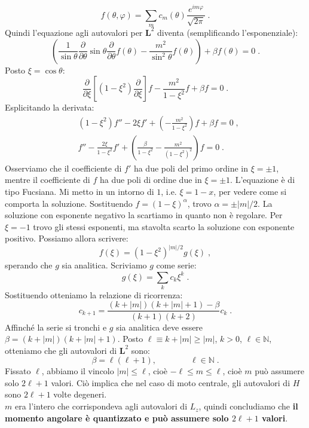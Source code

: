 \documentclass[10pt,a4paper]{report}
\theoremstyle{definition}
\numberwithin{equation}{section}
\begin{document}
\begin{equation}
f(\theta,\varphi)=\sum_m c_m(\theta)\frac{e^{im\varphi}}{\sqrt{2\pi}}\;.
\end{equation}
Quindi l'equazione agli autovalori per $\mathbf{L}^2$ diventa (semplificando l'esponenziale):
\begin{equation}
\left(\frac{1}{\sin\theta}\frac{\partial}{\partial\theta}\sin\theta\frac{\partial}{\partial\theta}f(\theta)-\frac{m^2}{\sin^2\theta}f(\theta)\right)+\beta f(\theta)=0\;.
\end{equation}
Posto $\xi=\cos\theta$:
\begin{equation}
\frac{\partial}{\partial\xi}\left[(1-\xi^2)\frac{\partial}{\partial\xi}\right]f-\frac{m^2}{1-\xi^2}f+\beta f=0\;.
\end{equation}
Esplicitando la derivata:
\begin{align*}
&(1-\xi^2)f''-2\xi f'+\left(-\frac{m^2}{1-\xi^2}\right)f+\beta f=0\;, \\
&f''-\frac{2\xi}{1-\xi^2}f'+\left(\frac{\beta}{1-\xi^2}-\frac{m^2}{(1-\xi^2)^2}\right)f=0\;.
\end{align*}
Osserviamo che il coefficiente di $f'$ ha due poli del primo ordine in $\xi=\pm 1$, mentre il coefficiente di $f$ ha due poli di ordine due in $\xi=\pm 1$. L'equazione è di tipo Fucsiana. Mi metto in un intorno di $1$, i.e. $\xi=1-x$, per vedere come si comporta la soluzione. Sostituendo $f=(1-\xi)^{\alpha}$, trovo $\alpha=\pm |m|/2$. La soluzione con esponente  negativo la scartiamo in quanto non è regolare. Per $\xi=-1$ trovo gli stessi esponenti, ma stavolta scarto la soluzione con esponente positivo. Possiamo allora scrivere:
\begin{equation}
f(\xi)=(1-\xi^2)^{|m|/2}g(\xi)\;,
\end{equation}
sperando che $g$ sia analitica. Scriviamo $g$ come serie:
\begin{equation}
g(\xi)=\sum_k c_k \xi^k\;.
\end{equation}
Sostituendo otteniamo la relazione di ricorrenza:
\begin{equation}
c_{k+1}=\frac{(k+|m|)(k+|m|+1)-\beta}{(k+1)(k+2)}c_k\;.
\end{equation}
Affinché la serie si tronchi e $g$ sia analitica deve essere $\beta=(k+|m|)(k+|m|+1)$. Posto $\ell\equiv k+|m|\ge |m|$, $k>0$, $\ell\in\mathbb{N}$, otteniamo che gli autovalori di $\mathbf{L}^2$ sono:
\begin{equation}
\beta=\ell(\ell+1),\qquad \qquad \ell\in\mathbb{N}\;.
\end{equation}
Fissato $\ell$, abbiamo il vincolo $|m|\le \ell$, cioè $-\ell\le m\le \ell$, cioè $m$ può assumere solo $2\ell+1$ valori. Ciò implica che nel caso di moto centrale, gli autovalori di $H$ sono $2\ell+1$ volte degeneri. \\
$m$ era l'intero che corrispondeva agli autovalori di $L_z$, quindi concludiamo che \textbf{il momento angolare è quantizzato e può assumere solo $2\ell+1$ valori}.
\end{document}
